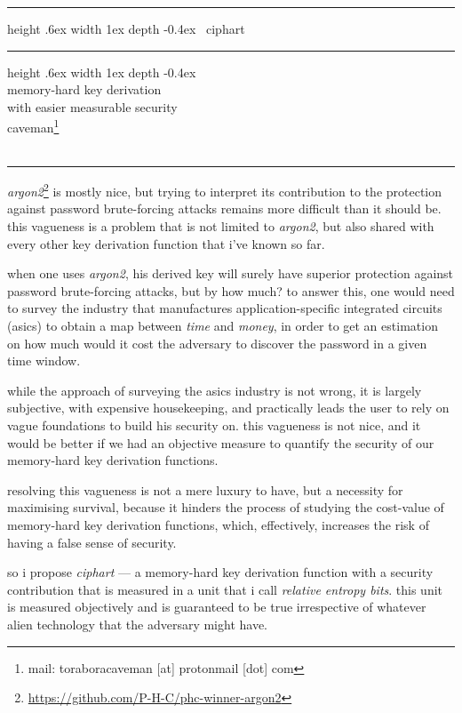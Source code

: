 \documentclass[twocolumn]{article}
\makeatletter
\def\myrulefill{%
    \leavevmode\leaders\hrule%
    height .6ex width 1ex depth -0.4ex%
    \hfill\kern\z@%
}
\makeatother
\begin{document}
\SetInd{.15em}{1em}

\begin{center}
\Huge
\myrulefill\ ciphart \myrulefill\\
\LARGE
memory-hard key derivation \\
with easier measurable security\\
\normalsize
caveman\footnote{mail: toraboracaveman [at] protonmail [dot] com}\\
\footnotesize
\DTMnow\\
\rule{1\columnwidth}{2pt}
\end{center}

\emph{argon2}\footnote{\url{https://github.com/P-H-C/phc-winner-argon2}} is
mostly nice, but trying to interpret its contribution to the protection
against password brute-forcing attacks remains more difficult than it
should be.  this vagueness is a problem that is not limited to
\emph{argon2}, but also shared with every other key derivation function
that i've known so far.

when one uses \emph{argon2}, his derived key will surely have superior
protection against password brute-forcing attacks, but by how much?  to
answer this, one would need to survey the industry that manufactures
application-specific integrated circuits (asics) to obtain a map between
\emph{time} and \emph{money}, in order to get an estimation on how much
would it cost the adversary to discover the password in a given time
window.

while the approach of surveying the asics industry is not wrong, it is
largely subjective, with expensive housekeeping, and practically leads the
user to rely on vague foundations to build his security on.  this vagueness
is not nice, and it would be better if we had an objective measure to
quantify the security of our memory-hard key derivation functions.

resolving this vagueness is not a mere luxury to have, but a necessity for
maximising survival, because it hinders the process of studying the
cost-value of memory-hard key derivation functions, which, effectively,
increases the risk of having a false sense of security.

so i propose \emph{ciphart} --- a memory-hard key derivation function with
a security contribution that is measured in a unit that i call
\emph{relative entropy bits}.  this unit is measured objectively and is
guaranteed to be true irrespective of whatever alien technology that the
adversary might have.
\end{document}
